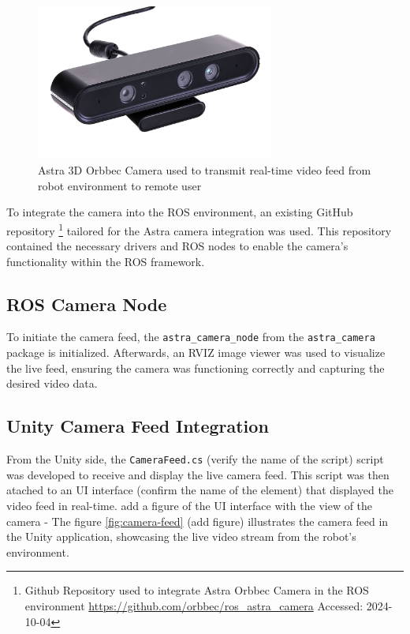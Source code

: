     \begin{figure}[h]
        \centering
        \includegraphics[width=0.7\textwidth]{figs/AstraSeries_3.jpg}
        \caption{Astra 3D Orbbec Camera used to transmit real-time video feed from robot environment to remote user}
        \label{fig:astra-camera}
    \end{figure}
    \FloatBarrier

    To integrate the camera into the ROS environment, an existing GitHub repository \footnote{Github Repository used to integrate Astra Orbbec Camera in the ROS environment \url{https://github.com/orbbec/ros_astra_camera} Accessed: 2024-10-04} tailored for the Astra camera integration was used. This repository contained the necessary drivers and ROS nodes to enable the camera's functionality within the ROS framework.

    \subsection{ROS Camera Node}
    To initiate the camera feed, the \texttt{astra\_camera\_node} from the \texttt{astra\_camera} package is initialized. Afterwards, an RVIZ image viewer was used to visualize the live feed, ensuring the camera was functioning correctly and capturing the desired video data.

    \subsection{Unity Camera Feed Integration}
    From the Unity side, the \texttt{CameraFeed.cs} (verify the name of the script) script was developed to receive and display the live camera feed. This script was then atached to an UI interface (confirm the name of the element) that displayed the video feed in real-time. 
    add a figure of the UI interface with the view of the camera - The figure \ref{fig:camera-feed} (add figure) illustrates the camera feed in the Unity application, showcasing the live video stream from the robot's environment.

